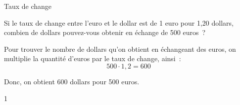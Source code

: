 \documentclass[a4paper,11pt]{report}
\begin{document}
%
%
%
%
%
%
%
%
%
%
%
%




\begin{resolu}{Taux de change}
{Si le taux de change entre l'euro et le dollar est de 1 euro pour 1,20 dollars, combien de dollars pouvez-vous obtenir en échange de 500 euros~?

{\color{blue}

Pour trouver le nombre de dollars qu'on obtient en échangeant des euros, on multiplie la quantité d'euros par le taux de change, ainsi~:
$$ 500 \cdot 1,2 = 600$$}
Donc, on obtient 600 dollars pour 500 euros.
}{1}
\end{resolu}
\end{document}
